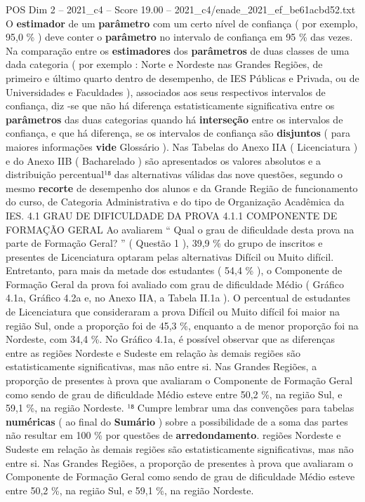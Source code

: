 \begin{textsample}{POS Dim 2 – 2021\_c4 – Score 19.00 – 2021\_c4/enade\_2021\_ef\_be61acbd52.txt}
O \textbf{estimador} de um \textbf{parâmetro} com um certo nível de confiança ( por exemplo, 95,0 \% ) deve conter o \textbf{parâmetro} no intervalo de confiança em 95 \% das vezes.
Na comparação entre os \textbf{estimadores} dos \textbf{parâmetros} de duas classes de uma dada categoria ( por exemplo : Norte e Nordeste nas Grandes Regiões, de primeiro e último quarto dentro de desempenho, de IES Públicas e Privada, ou de Universidades e Faculdades ), associados aos seus respectivos intervalos de confiança, diz -se que não há diferença estatisticamente significativa entre os \textbf{parâmetros} das duas categorias quando há \textbf{interseção} entre os intervalos de confiança, e que há diferença, se os intervalos de confiança são \textbf{disjuntos} ( para maiores informações \textbf{vide} Glossário ).
Nas Tabelas do Anexo IIA ( Licenciatura ) e do Anexo IIB ( Bacharelado ) são apresentados os valores absolutos e a distribuição percentual¹⁸ das alternativas válidas das nove questões, segundo o mesmo \textbf{recorte} de desempenho dos alunos e da Grande Região de funcionamento do curso, de Categoria Administrativa e do tipo de Organização Acadêmica da IES. 4.1 GRAU DE DIFICULDADE DA PROVA 4.1.1 COMPONENTE DE FORMAÇÃO GERAL Ao avaliarem “ Qual o grau de dificuldade desta prova na parte de Formação Geral? ” ( Questão 1 ), 39,9 \% do grupo de inscritos e presentes de Licenciatura optaram pelas alternativas Difícil ou Muito difícil.
Entretanto, para mais da metade dos estudantes ( 54,4 \% ), o Componente de Formação Geral da prova foi avaliado com grau de dificuldade Médio ( Gráfico 4.1a, Gráfico 4.2a e, no Anexo IIA, a Tabela II.1a ).
O percentual de estudantes de Licenciatura que consideraram a prova Difícil ou Muito difícil foi maior na região Sul, onde a proporção foi de 45,3 \%, enquanto a de menor proporção foi na Nordeste, com 34,4 \%.
No Gráfico 4.1a, é possível observar que as diferenças entre as regiões Nordeste e Sudeste em relação às demais regiões são estatisticamente significativas, mas não entre si.
Nas Grandes Regiões, a proporção de presentes à prova que avaliaram o Componente de Formação Geral como sendo de grau de dificuldade Médio esteve entre 50,2 \%, na região Sul, e 59,1 \%, na região Nordeste. ¹⁸ Cumpre lembrar uma das convenções para tabelas \textbf{numéricas} ( ao final do \textbf{Sumário} ) sobre a possibilidade de a soma das partes não resultar em 100 \% por questões de \textbf{arredondamento}. regiões Nordeste e Sudeste em relação às demais regiões são estatisticamente significativas, mas não entre si.
Nas Grandes Regiões, a proporção de presentes à prova que avaliaram o Componente de Formação Geral como sendo de grau de dificuldade Médio esteve entre 50,2 \%, na região Sul, e 59,1 \%, na região Nordeste.

\end{textsample}
